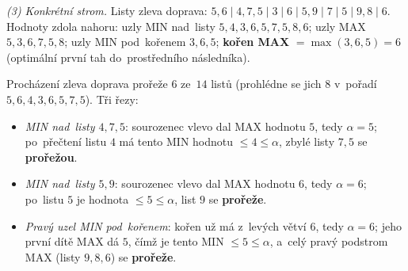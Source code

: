 \noindent\emph{(3) Konkrétní strom.} Listy zleva doprava: $5,6\mid 4,7,5\mid 3\mid 6\mid 5,9\mid 7\mid 5\mid 9,8\mid 6$. Hodnoty zdola nahoru: uzly MIN nad~listy $5,4,3,6,5,7,5,8,6$; uzly MAX $5,3,6,7,5,8$; uzly MIN pod~kořenem $3,6,5$; \textbf{kořen MAX} $=\max(3,6,5)=\boxed{6}$ (optimální první tah do~prostředního následníka).

Procházení zleva doprava prořeže $6$ ze~$14$ listů (prohlédne se jich $8$ v~pořadí $5,6,4,3,6,5,7,5$). Tři řezy:
\begin{itemize}[nosep]
  \item \emph{MIN nad~listy $4,7,5$}: sourozenec vlevo dal MAX hodnotu $5$, tedy $\alpha=5$; po~přečtení listu $4$ má tento MIN hodnotu $\le4\le\alpha$, zbylé listy $7,5$ se \textbf{prořežou}.
  \item \emph{MIN nad~listy $5,9$}: sourozenec vlevo dal MAX hodnotu $6$, tedy $\alpha=6$; po~listu $5$ je hodnota $\le5\le\alpha$, list $9$ se \textbf{prořeže}.
  \item \emph{Pravý uzel MIN pod~kořenem}: kořen už má z~levých větví $6$, tedy $\alpha=6$; jeho první dítě MAX dá $5$, čímž je tento MIN $\le5\le\alpha$, a~celý pravý podstrom MAX (listy $9,8,6$) se \textbf{prořeže}.
\end{itemize}
